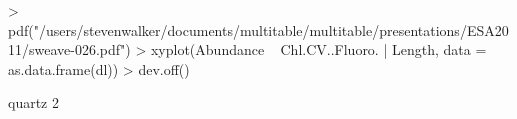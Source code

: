 \documentclass{article}
\numberwithin{exercise}{section}
\begin{document}
\begin{Schunk}
\begin{Sinput}
> pdf("/users/stevenwalker/documents/multitable/multitable/presentations/ESA2011/sweave-026.pdf")
> xyplot(Abundance ~ Chl.CV..Fluoro. | Length, data = as.data.frame(dl))
> dev.off()
\end{Sinput}
\begin{Soutput}
quartz 
     2 
\end{Soutput}
\end{Schunk}
\end{document}
